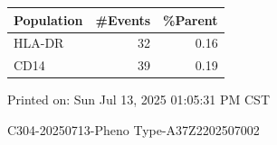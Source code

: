 \documentclass[UTF8,10pt,a4paper,fontset=fandol]{ctexart}
\newcommand{\fieldvalue}[1]{#1}
\begin{document}
\vspace{0.4em}

\noindent
\begin{tabularx}{0.62\textwidth}{@{}l r r@{}}
Population & \#Events & \%Parent\\
\hline
HLA-DR &
\fieldvalue{32} &
\fieldvalue{0.16}
\\
CD14 &
\fieldvalue{39} &
\fieldvalue{0.19}
\\
\hline
\end{tabularx}

\vfill

\begin{center}
Printed on: Sun Jul 13, 2025 01:05:31 PM CST
\end{center}

\newpage

\begin{center}
C304-20250713-Pheno Type-A37Z2202507002
\end{center}
\end{document}
